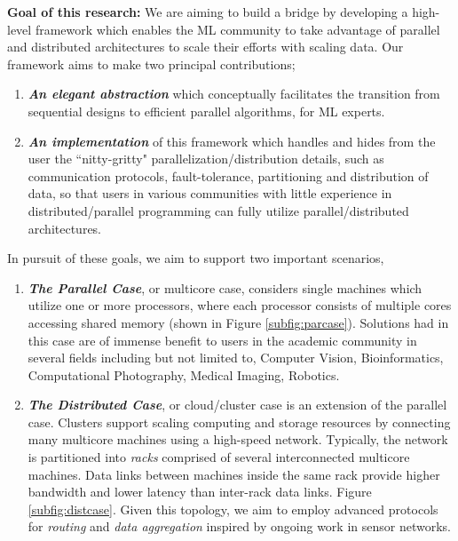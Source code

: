 \documentclass[acmtocl]{acmtrans2m}
\begin{document}
{\bf Goal of this research:} We are aiming to build a bridge by developing a high-level framework which enables the ML community to take advantage of parallel and distributed architectures to scale their efforts with scaling data. Our framework aims to make two principal contributions;

\begin{enumerate}

\item \textbf{\textit{An elegant abstraction}} which conceptually facilitates the transition from sequential designs to efficient parallel algorithms, for ML experts.

\item \textbf{\textit{An implementation}} of this framework which handles and hides from the user the ``nitty-gritty" parallelization/distribution details, such as communication protocols, fault-tolerance, partitioning and distribution of data, so that users in various communities with little experience in distributed/parallel programming can fully utilize parallel/distributed architectures.

\end{enumerate}


In pursuit of these goals, we aim to support two important scenarios,

\begin{enumerate}

\item \textbf{\textit{The Parallel Case}}, or multicore case, considers single machines which utilize one or more processors, where each processor consists of multiple cores accessing shared memory (shown in Figure \ref{subfig:parcase}). Solutions had in this case are of immense benefit to users in the academic community in several fields including but not limited to, Computer Vision, Bioinformatics, Computational Photography, Medical Imaging, Robotics.

\item \textbf{\textit{The Distributed Case}}, or cloud/cluster case is an extension of the parallel case. Clusters support scaling computing and storage resources by connecting many multicore machines using a high-speed network. Typically, the network is partitioned into {\em racks} comprised of several interconnected multicore machines. Data links between machines inside the same rack provide higher bandwidth and lower latency than inter-rack data links. Figure \ref{subfig:distcase}. Given this topology, we aim to employ advanced protocols for {\em routing} and {\em data aggregation} inspired by ongoing work in sensor networks.
\end{enumerate}
\end{document}
